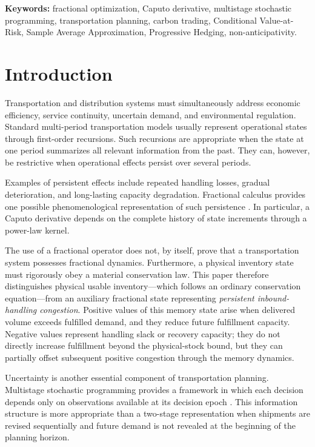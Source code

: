 \documentclass[11pt,a4paper]{article}
\begin{document}
\noindent
\textbf{Keywords:}
fractional optimization,
Caputo derivative,
multistage stochastic programming,
transportation planning,
carbon trading,
Conditional Value-at-Risk,
Sample Average Approximation,
Progressive Hedging,
non-anticipativity.

\section{Introduction}

Transportation and distribution systems must simultaneously address
economic efficiency, service continuity, uncertain demand, and
environmental regulation. Standard multi-period transportation models
usually represent operational states through first-order recursions. Such
recursions are appropriate when the state at one period summarizes all
relevant information from the past. They can, however, be restrictive
when operational effects persist over several periods.

Examples of persistent effects include repeated handling losses, gradual
deterioration, and long-lasting capacity degradation. Fractional
calculus provides one possible phenomenological representation of such
persistence \citep{caputo1967,podlubny1999,diethelm2010}. In particular,
a Caputo derivative depends on the complete history of state increments
through a power-law kernel.

The use of a fractional operator does not, by itself, prove that a
transportation system possesses fractional dynamics. Furthermore, a
physical inventory state must rigorously obey a material conservation
law. This paper therefore distinguishes physical usable inventory---which
follows an ordinary conservation equation---from an auxiliary fractional
state representing \emph{persistent inbound-handling congestion}. Positive
values of this memory state arise when delivered volume exceeds fulfilled
demand, and they reduce future fulfillment capacity. Negative values
represent handling slack or recovery capacity; they do not directly
increase fulfillment beyond the physical-stock bound, but they can
partially offset subsequent positive congestion through the memory
dynamics.

Uncertainty is another essential component of transportation planning.
Multistage stochastic programming provides a framework in which each
decision depends only on observations available at its decision epoch
\citep{birge2011,shapiro2014}. This information structure is more
appropriate than a two-stage representation when shipments are revised
sequentially and future demand is not revealed at the beginning of the
planning horizon.
\end{document}
